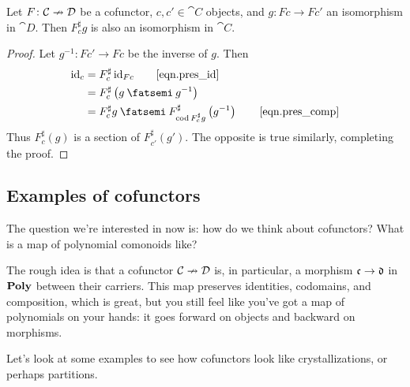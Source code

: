 \documentclass[Book-Poly]{subfiles}
\begin{document}
\begin{proposition}\label{prop.cofunctors_isos}
Let $F\colon\mathcal{C}\nrightarrow\mathcal{D}$ be a cofunctor, $c,c'\in\cat{C}$ objects, and $g\colon Fc\to Fc'$ an isomorphism in $\cat{D}$. Then $F^\sharp_{c}g$ is also an isomorphism in $\cat{C}$.
\end{proposition}
\begin{proof}
Let $g^{-1}\colon Fc'\to Fc$ be the inverse of $g$.
Then
\begin{align*}
	\id_c&=
	F^\sharp_c\,\id_{Fc} \tag*{\eqref{eqn.pres_id}}\\&=
	F^\sharp_c\left(g\then g^{-1}\right)\\&=
	F^\sharp_c g\then F^\sharp_{\cod F^\sharp_c g}\left(g^{-1}\right) \tag*{\eqref{eqn.pres_comp}}
\end{align*}
Thus $F^\sharp_{c}(g)$ is a section of $F^\sharp_{c'}(g')$. The opposite is true similarly, completing the proof.
\end{proof}

\subsection{Examples of cofunctors}

The question we're interested in now is: how do we think about cofunctors? What is a map of polynomial comonoids like?

The rough idea is that a cofunctor $\mathcal{C}\nrightarrow\mathcal{D}$ is, in particular, a morphism $\mathfrak{c}\to\mathfrak{d}$ in $\mathbf{Poly}$ between their carriers. This map preserves identities, codomains, and composition, which is great, but you still feel like you've got a map of polynomials on your hands: it goes forward on objects and backward on morphisms.


Let's look at some examples to see how cofunctors look like crystallizations, or perhaps partitions.






\end{document}
